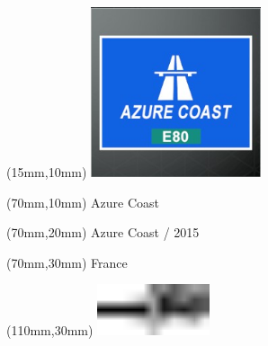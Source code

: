 \null\newpage
\begin{textblock*}{50mm}(15mm,10mm)%
\includegraphics[width=50mm]{LG/2015-05-20_00073.png}
\end{textblock*}
\begin{textblock*}{130mm}(70mm,10mm)%
{\fontsize{20}{20}\selectfont Azure Coast}\\
\end{textblock*}
\begin{textblock*}{120mm}(70mm,20mm)%
{\fontsize{16}{16}\selectfont Azure Coast / 2015}\\
\end{textblock*}
\begin{textblock*}{120mm}(70mm,30mm)%
{\fontsize{12}{12}\selectfont France}
\end{textblock*}
\begin{textblock*}{30mm}(110mm,30mm)%
\centering
\includegraphics[height=15mm]{icons/tofinish.pdf}
\end{textblock*}
